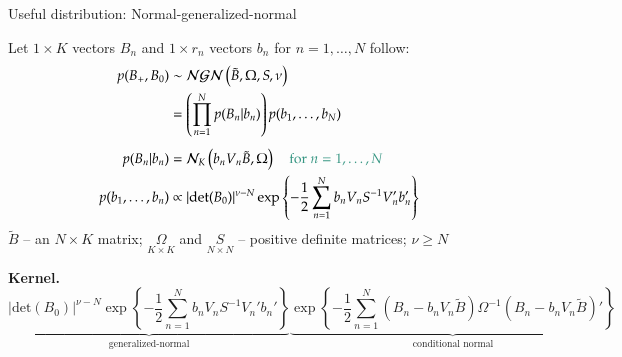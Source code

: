 \documentclass[notes,blackandwhite,mathsans,usenames,dvipsnames]{beamer}
\begin{document}
%
%




\begin{frame}{Useful distribution: {\color{purple}Normal-generalized-normal}}

\bigskip
{\color{mcxs2}Let} $1\times K$ {\color{mcxs2}vectors} $B_n$ {\color{mcxs2}and} $1\times r_n$ {\color{mcxs2}vectors} $b_n$ {\color{mcxs2}for} $n=1,\dots,N$ {\color{mcxs2}follow:}
\begin{align*}
p(B_+,B_0)&\sim\mathcal{NGN}\left( \tilde{B}, \Omega, S , \nu  \right)\\
&= \left(\prod_{n=1}^{N}p(B_n|b_n)\right)p(b_1,\dots,b_N)\\[1ex]
p(B_n|b_n) &=\mathcal{N}_K\left(b_nV_n\tilde{B},\Omega \right)\quad{\color{mcxs2}\text{for }n=1,\dots,N}\\
p(b_1, \dots,b_n) &\propto |\text{det}(B_0)|^{\nu-N}\exp\left\{ -\frac{1}{2}\sum_{n=1}^N b_nV_nS^{-1}V_n'b_n'\right\}
\end{align*}
\footnotesize $\tilde{B}$ {\color{mcxs2}-- an} $N\times K$ {\color{mcxs2}matrix;} $\underset{K\times K}{\Omega}$ {\color{mcxs2}and} $\underset{N\times N}{S}$ {\color{mcxs2}-- positive definite matrices;} $\nu\geq N$

\bigskip\normalsize\textbf{Kernel.}\scriptsize
$$
\underbrace{|\text{det}(B_0)|^{\nu-N}\exp\left\{ -\frac{1}{2}\sum_{n=1}^N b_nV_nS^{-1}V_n'b_n'\right\}}_{\text{generalized-normal}}
\underbrace{\exp\left\{ -\frac{1}{2}\sum_{n=1}^N (B_n-b_nV_n\tilde{B})\Omega^{-1}(B_n-b_nV_n\tilde{B})'\right\}}_{\text{conditional normal}}
$$
\end{frame}
\end{document}
